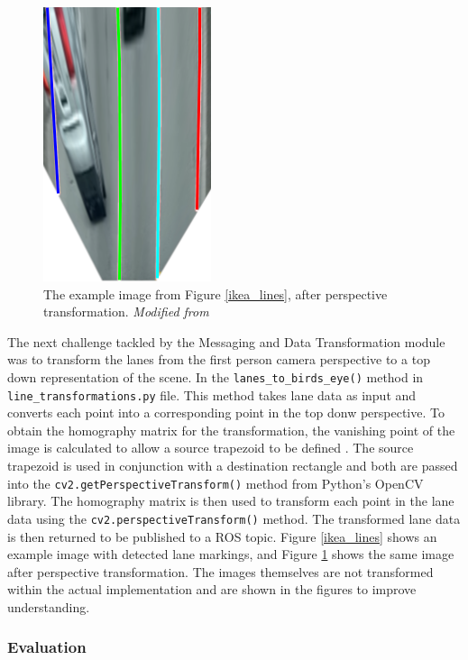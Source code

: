 \documentclass[titlepage, draft]{article}
\begin{document}
{\begin{figure}
	\centering
	\includegraphics[height=0.6\textwidth]{top_down_ikea.png}
	\caption{The example image from Figure \ref{ikea_lines}, after perspective transformation.  \textit{Modified from} \cite{ikea_image}}
	\label{transformed_ikea}
\end{figure}

The next challenge tackled by the Messaging and Data Transformation module was to transform the lanes from the first person camera perspective to a top down representation of the scene. In the \texttt{lanes\_to\_birds\_eye()} method in \texttt{line\_transformations.py} file. This method takes lane data as input and converts each point into a corresponding point in the top donw perspective. To obtain the homography matrix for the transformation, the vanishing point of the image is calculated to allow a source trapezoid to be defined \cite{johncmitchell}. The source trapezoid is used in conjunction with a destination rectangle and both are passed into the \texttt{cv2.getPerspectiveTransform()} method from Python's OpenCV library. The homography matrix is then used to transform each point in the lane data using the \texttt{cv2.perspectiveTransform()} method. The transformed lane data is then returned to be published to a ROS topic. Figure \ref{ikea_lines} shows an example image with detected lane markings, and Figure \ref{transformed_ikea} shows the same image after perspective transformation. The images themselves are not transformed within the actual implementation and are shown in the figures to improve understanding.


\subsubsection{Evaluation}

}
\end{document}
